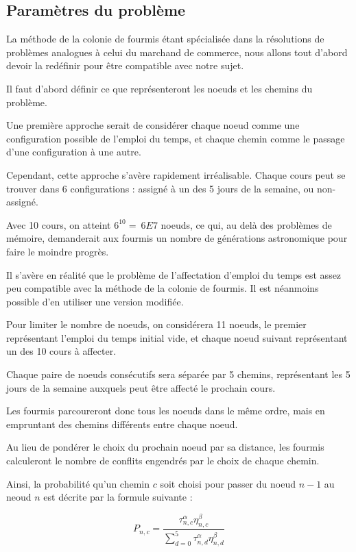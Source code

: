 
\subsection {Paramètres du problème}

La méthode de la colonie de fourmis étant spécialisée dans la résolutions de problèmes analogues à celui du marchand de commerce, nous allons tout d'abord devoir la redéfinir pour être compatible avec notre sujet.

Il faut d'abord définir ce que représenteront les noeuds et les chemins du problème.

Une première approche serait de considérer chaque noeud comme une configuration possible de l'emploi du temps, et chaque chemin comme le passage d'une configuration à une autre.

Cependant, cette approche s'avère rapidement irréalisable. Chaque cours peut se trouver dans 6 configurations : assigné à un des 5 jours de la semaine, ou non-assigné.

Avec 10 cours, on atteint $6^{10} = ~6E7$ noeuds, ce qui, au delà des problèmes de mémoire, demanderait aux fourmis un nombre de générations astronomique pour faire le moindre progrès.

Il s'avère en réalité que le problème de l'affectation d'emploi du temps est assez peu compatible avec la méthode de la colonie de fourmis. Il est néanmoins possible d'en utiliser une version modifiée.

Pour limiter le nombre de noeuds, on considérera 11 noeuds, le premier représentant l'emploi du temps initial vide, et chaque noeud suivant représentant un des 10 cours à affecter.

Chaque paire de noeuds consécutifs sera séparée par 5 chemins, représentant les 5 jours de la semaine auxquels peut être affecté le prochain cours.

Les fourmis parcoureront donc tous les noeuds dans le même ordre, mais en empruntant des chemins différents entre chaque noeud.

Au lieu de pondérer le choix du prochain noeud par sa distance, les fourmis calculeront le nombre de conflits engendrés par le choix de chaque chemin.

Ainsi, la probabilité qu'un chemin $c$ soit choisi pour passer du noeud $n-1$ au neoud $n$ est décrite par la formule suivante : 

$$P_{n,c} = \frac{\tau^{\alpha}_{n,c}\eta^{\beta}_{n,c}}{\sum^{5}_{d = 0}{\tau^{\alpha}_{n,d}\eta^{\beta}_{n,d}}}$$

